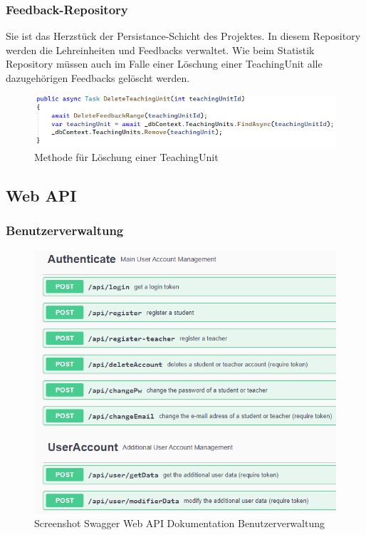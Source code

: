 \subsubsection{Feedback-Repository}
Sie ist das Herzstück der Persistance-Schicht des Projektes. In diesem Repository werden die Lehreinheiten und Feedbacks 
verwaltet. Wie beim Statistik Repository müssen auch im Falle einer Löschung einer TeachingUnit alle dazugehörigen Feedbacks gelöscht werden.

\begin{figure}[h]
    \begin{center}
        \includegraphics[width=15cm]{./pics/Persistance/DeleteTeachingUnit.png}
    \caption[DelTeachingUnit]{Methode für Löschung einer TeachingUnit}
    \end{center}
\end{figure}

\newpage
\subsection{Web API}
\author{Stefano Pyringer}

\subsubsection{Benutzerverwaltung}
\author{Stefano Pyringer}

\begin{figure}[h]
    \includegraphics*[width=15cm]{./pics/Screenshot_Swagger_Auth.png}
    \caption[Swagger Benutzerverwaltung]{Screenshot Swagger Web API Dokumentation Benutzerverwaltung}
\end{figure}

